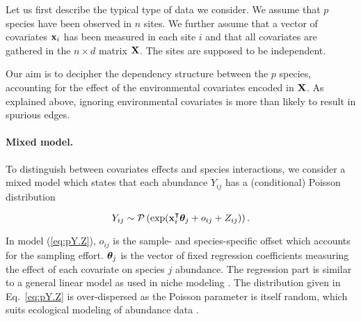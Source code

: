 Let us first describe the typical type of data we consider. We assume that $p$ species have been observed in $n$ sites.  We further assume that a vector of covariates ${\bf x}_i$  has been measured in each site $i$ and that all covariates are gathered in the $n \times d$ matrix ${\bf X}$. The sites are supposed to be independent.

Our aim is to decipher the dependency structure between the $p$ species, accounting for the effect of the environmental covariates encoded in ${\bf X}$. As explained above, ignoring environmental covariates is more than likely to result in spurious edges. 

\paragraph{Mixed model.}
To distinguish between covariates effects and species interactions, we consider a mixed model which states that each abundance $Y_{ij}$ has a (conditional) Poisson distribution
\begin{linenomath*}
\begin{equation} \label{eq:pY.Z}
    Y_{ij} \sim \mathcal{P}\left(\exp({\bf x}_i^\intercal {\boldsymbol{\theta}}_j + o_{ij} + Z_{ij})\right).
\end{equation}
\end{linenomath*}
In model (\ref{eq:pY.Z}), $o_{ij}$ is the sample- and species-specific offset which accounts for the sampling effort. ${\boldsymbol{\theta}}_j$ is the vector of fixed regression coefficients measuring the effect of each covariate on species $j$ abundance. The regression part is similar to a general linear model as used in niche modeling \citep[see e.g.][]{austin2007species}. 
The distribution given in Eq.~\eqref{eq:pY.Z} is over-dispersed as the Poisson parameter is itself random, which suits ecological modeling of abundance data \citep{Eco_overdisp}.

